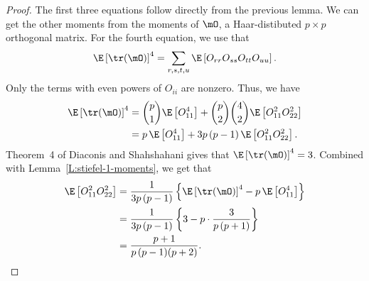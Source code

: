\begin{proof}
    The first three equations follow directly from the previous lemma.
    We can get the other moments from the moments of $\mO$, a Haar-distibuted
    $p \times p$ orthogonal matrix. For the fourth equation, we use that 
    \[
        \E \left[ \tr( \mO ) \right]^4
        =
        \sum_{r,s,t,u} \E \left[ O_{rr} O_{ss} O_{tt} O_{uu} \right].
    \]
    Only the terms with even powers of $O_{ii}$ are nonzero.  Thus, we have
    \begin{align*}
        \E \left[ \tr( \mO ) \right]^4
        &=   \binom{p}{1} \E \left[ O_{11}^4 \right]
           + \binom{p}{2} \binom{4}{2} \E \left[ O_{11}^2 O_{22}^2 \right] \\
        &=   p \, \E \left[ O_{11}^4 \right]
           + 3p \, (p-1) \, \E \left[ O_{11}^2 O_{22}^2 \right].
    \end{align*}
    Theorem~4 of Diaconis and Shahshahani \cite{diaconis1994erm} gives that 
    $\E \left[ \tr(\mO) \right]^4 = 3$.  Combined with
    Lemma~\ref{L:stiefel-1-moments}, we get that
    \begin{align*}
        \E \left[ O_{11}^2 O_{22}^2 \right]
        &= \frac{1}{3p \, (p-1)} 
            \left\{
                \E \left[ \tr(\mO) \right]^4
                - p \, \E \left[ O_{11}^4 \right]
            \right\} \\
        &= \frac{1}{3p \, (p-1)} 
           \left\{
                3 - p \cdot \frac{3}{ p \, (p+1) }
           \right\} \\
        &= \frac{p+1}{ p \, (p-1) (p+2) }.
    \end{align*}
    

\end{proof}
